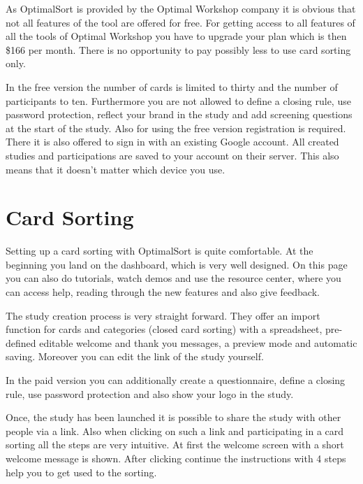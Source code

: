 As OptimalSort is provided by the Optimal Workshop company it is
obvious that not all features of the tool are offered for free.  For
getting access to all features of all the tools of Optimal Workshop
you have to upgrade your plan which is then \$166 per month. There is
no opportunity to pay possibly less to use card sorting only.

In the free version the number of cards is limited to thirty and the
number of participants to ten.  Furthermore you are not allowed to
define a closing rule, use password protection, reflect your brand in
the study and add screening questions at the start of the study.  Also
for using the free version registration is required. There it is also
offered to sign in with an existing Google account. All created
studies and participations are saved to your account on their
server. This also means that it doesn't matter which device 
you use.



\section{Card Sorting}

Setting up a card sorting with OptimalSort is quite comfortable. At the 
beginning you land on the dashboard, which is very well designed. On 
this page you can also do tutorials, watch demos and use the resource
center, where you can access help, reading through the new features 
and also give feedback.

The study creation process is very straight forward. They offer an 
import function for cards and categories (closed card sorting) with a 
spreadsheet, pre-defined editable welcome and thank you messages, 
a preview mode and automatic saving. Moreover you can edit the link 
of the study yourself. 

In the paid version you can additionally create a questionnaire, define 
a closing rule, use password protection and also show your logo 
in the study.

Once, the study has been launched it is possible to share the study 
with other people via a link. Also when clicking on such a link and 
participating in a card sorting all the steps are very intuitive. At first 
the welcome screen with a short welcome message is shown. After 
clicking continue the instructions with 4 steps help you to get used 
to the sorting. 



